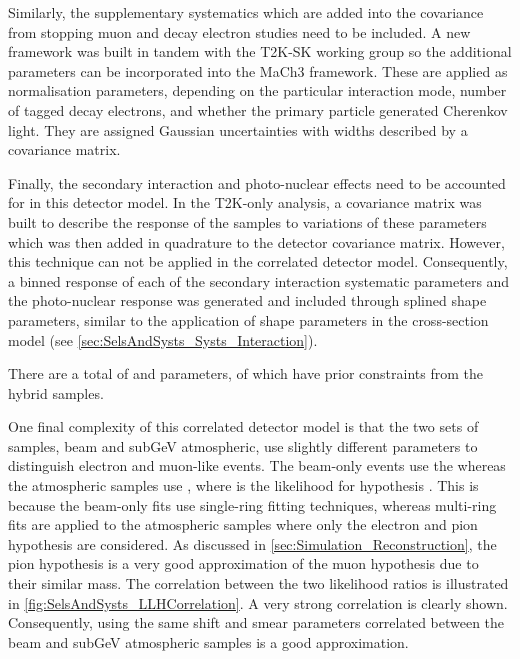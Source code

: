 Similarly, the supplementary systematics which are added into the covariance from stopping muon and decay electron studies need to be included. A new framework \cite{t2ksk-common} was built in tandem with the T2K-SK working group \cite{t2k_tn_399} so the additional parameters can be incorporated into the MaCh3 framework. These are applied as normalisation parameters, depending on the particular interaction mode, number of tagged decay electrons, and whether the primary particle generated Cherenkov light. They are assigned Gaussian uncertainties with widths described by a covariance matrix.

Finally, the secondary interaction and photo-nuclear effects need to be accounted for in this detector model. In the T2K-only analysis, a covariance matrix was built to describe the response of the samples to variations of these parameters which was then added in quadrature to the detector covariance matrix. However, this technique can not be applied in the correlated detector model. Consequently, a binned response of each of the secondary interaction systematic parameters and the photo-nuclear response was generated and included through splined shape parameters, similar to the application of shape parameters in the cross-section model (see \autoref{sec:SelsAndSysts_Systs_Interaction}).

There are a total of   and  parameters, of which  have prior constraints from the hybrid  samples.

One final complexity of this correlated detector model is that the two sets of samples, beam and subGeV atmospheric, use slightly different parameters to distinguish electron and muon-like events. The beam-only events use the  whereas the atmospheric samples use , where  is the likelihood for hypothesis . This is because the beam-only fits use single-ring \fq fitting techniques, whereas multi-ring fits are applied to the atmospheric samples where only the electron and pion hypothesis are considered. As discussed in \autoref{sec:Simulation_Reconstruction}, the pion hypothesis is a very good approximation of the muon hypothesis due to their similar mass. The correlation between the two likelihood ratios is illustrated in \autoref{fig:SelsAndSysts_LLHCorrelation}. A very strong correlation is clearly shown. Consequently, using the same shift and smear parameters correlated between the beam and subGeV atmospheric samples is a good approximation.

